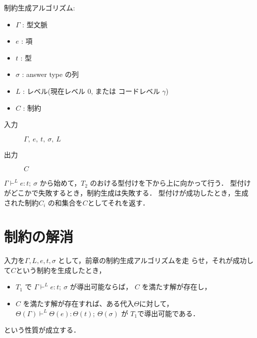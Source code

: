 \begin{framed}
  制約生成アルゴリズム:
  \begin{itemize}
    \setlength{\itemsep}{-5pt}
  \item $\Gamma$ : 型文脈
  \item $e$ : 項
  \item $t$ : 型
  \item $\sigma$ : answer type の列
  \item $L$ : レベル(現在レベル 0, または コードレベル $\gamma$)
  \item $C$ : 制約
  \end{itemize}

  \begin{description}
  \item[入力] $\Gamma,~ e,~ t,~ \sigma,~ L$
  \item[出力] $C$
  \end{description}

  $\Gamma \vdash^L e:t;~ \sigma$ から始めて，$T_2$ のおける型付けを下から上に向かって行う．
  型付けがどこかで失敗するとき，制約生成は失敗する．
  型付けが成功したとき，生成された制約$C_i$ の和集合を$C$としてそれを返す．
\end{framed}


\section{制約の解消}

入力を$\Gamma, L, e, t,\sigma$ として，前章の制約生成アルゴリズムを走
らせ，それが成功して$C$という制約を生成したとき，
\begin{itemize}
\item
  $T_1$ で $\Gamma \vdash^L e: t; ~ \sigma$ が導出可能ならば，
  $C$ を満たす解が存在し，
\item
  $C$ を満たす解が存在すれば、ある代入$\Theta$に対して，
  $\Theta(\Gamma) \vdash^L \Theta(e): \Theta(t) ;~ \Theta(\sigma)$ が $T_1$で導出可能である．
\end{itemize}
という性質が成立する．


